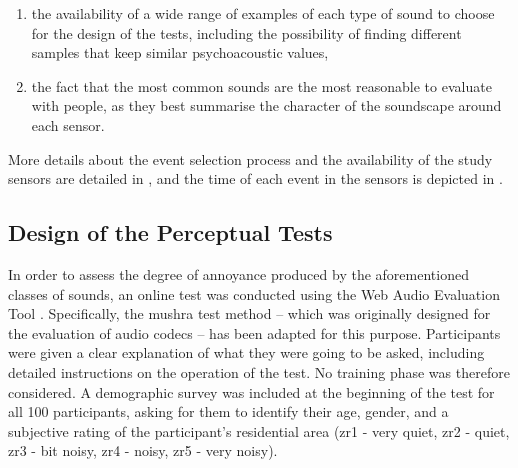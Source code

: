 \begin{enumerate}
  \item the availability of a wide range of examples of each type of sound to choose for the design of the tests, including the possibility of finding different samples that keep similar psychoacoustic values,
  \item the fact that the most common sounds are the most reasonable to evaluate with people, as they best summarise the character of the soundscape around each sensor.
\end{enumerate}
More details about the event selection process and the availability of the study sensors are detailed in \citep{LabairuTrenchs2018Noise}, and the time of each event in the sensors is depicted in \citep{AlsinaPages2021Perceptual}.

\subsection{Design of the Perceptual Tests}
\label{sec:DYNAMAPTests}
In order to assess the degree of annoyance produced by the aforementioned classes of sounds, an online test was conducted using the Web Audio Evaluation Tool \citep{Jillings2015Web}. Specifically, the \gls{mushra} test method \citep{IRB2015Method} -- which was originally designed for the evaluation of audio codecs -- has been adapted for this purpose. Participants were given a clear explanation of what they were going to be asked, including detailed instructions on the operation of the test. No training phase was therefore considered. A demographic survey was included at the beginning of the test for all 100 participants, asking for them to identify their age, gender, and a subjective rating of the participant's residential area (zr1 - very quiet, zr2 - quiet, zr3 - bit noisy, zr4 - noisy, zr5 - very noisy).

